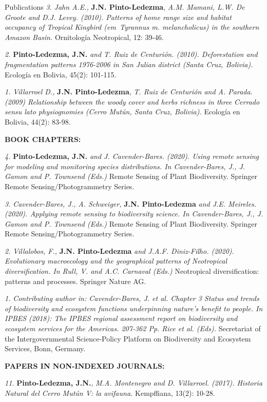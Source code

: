 \documentclass{resume} %
\begin{document}
\begin{rSection}{Publications}
{\em 3.} {\em Jahn A.E.,} {\bf{J.N. Pinto-Ledezma}}, {\em A.M. Mamani, L.W. De Groote and D.J. Levey. (2010). Patterns of home range size and habitat occupancy of Tropical Kingbird ({em\ Tyrannus m. melancholicus}) in the southern Amazon Basin.} {Ornitología Neotropical, 12: 39-46}. 

{\em 2.} {\bf{Pinto-Ledezma, J.N.}} {\em and T. Ruiz de Centurión. (2010). Deforestation and fragmentation patterns 1976-2006 in San Julian district (Santa Cruz, Bolivia).} {Ecología en Bolivia, 45(2): 101-115}.

{\em 1.} {\em Villarroel D.,} {\bf{J.N. Pinto-Ledezma}}, {\em T. Ruiz de Centurión and A. Parada. (2009) Relationship between the woody cover and herbs richness in three Cerrado {\em sensu lato} physiognomies (Cerro Mutún, Santa Cruz, Bolivia).} {Ecología en Bolivia, 44(2): 83-98}. 

{\bf BOOK CHAPTERS:}

{\em 4.} {\bf{Pinto-Ledezma, J.N.}} {\em and J. Cavender-Bares. (2020). Using remote sensing for modeling and monitoring species distributions. In Cavender-Bares, J., J. Gamon and P. Townsend (Eds.)} {Remote Sensing of Plant Biodiversity. Springer Remote Sensing/Photogrammetry Series}.

{\em 3.} {\em Cavender-Bares, J., A. Schweiger,} {\bf{J.N. Pinto-Ledezma}} {\em and J.E. Meireles. (2020). Applying remote sensing to biodiversity science. In Cavender-Bares, J., J. Gamon and P. Townsend (Eds.)} {Remote Sensing of Plant Biodiversity. Springer Remote Sensing/Photogrammetry Series}. 

{\em 2.} {\em Villalobos, F.,} {\bf{J.N. Pinto-Ledezma}} {\em and J.A.F. Diniz-Filho. (2020). Evolutionary macroecology and the geographical patterns of Neotropical diversification. In Rull, V. and A.C. Carnaval (Eds.)} {Neotropical diversification: patterns and processes. Springer Nature AG}. 

{\em 1.} {\em Contributing author in: Cavender-Bares, J. et al. Chapter 3 Status and trends of biodiversity and ecosystem functions underpinning nature’s benefit to people. In IPBES (2018): {\em The IPBES regional assessment report on biodiversity and ecosystem services for the Americas}. 207-362 Pp. Rice et al. (Eds).} {Secretariat of the Intergovernmental Science-Policy Platform on Biodiversity and Ecosystem Services, Bonn, Germany}. 

{\bf PAPERS IN NON-INDEXED JOURNALS:}

{\em 11.} {\bf{Pinto-Ledezma, J.N.}}, {\em M.A. Montenegro and D. Villarroel. (2017). Historia Natural del Cerro Mutún V: la avifauna.} {Kempffiana, 13(2): 10-28}.


\end{rSection}
\end{document}
